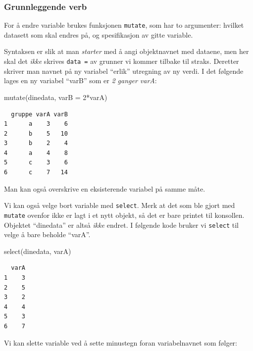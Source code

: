 \documentclass[
  letterpaper,
  DIV=11,
  numbers=noendperiod]{scrreprt}
\newenvironment{Shaded}{\begin{snugshade}}{\end{snugshade}}
\newcommand{\AttributeTok}[1]{\textcolor[rgb]{0.40,0.45,0.13}{#1}}
\newcommand{\DecValTok}[1]{\textcolor[rgb]{0.68,0.00,0.00}{#1}}
\newcommand{\FunctionTok}[1]{\textcolor[rgb]{0.28,0.35,0.67}{#1}}
\newcommand{\NormalTok}[1]{\textcolor[rgb]{0.00,0.23,0.31}{#1}}
\newcommand{\SpecialCharTok}[1]{\textcolor[rgb]{0.37,0.37,0.37}{#1}}
\theoremstyle{definition}
\theoremstyle{remark}
\begin{document}
\hypertarget{grunnleggende-verb}{%
\subsubsection{Grunnleggende verb}\label{grunnleggende-verb}}

For å endre variable brukes funksjonen \texttt{mutate}, som har to
argumenter: hvilket datasett som skal endres på, og spesifikasjon av
gitte variable.

Syntaksen er slik at man \emph{starter} med å angi objektnavnet med
dataene, men her skal det \emph{ikke} skrives \texttt{data\ =} av
grunner vi kommer tilbake til straks. Deretter skriver man navnet på ny
variabel ``erlik'' utregning av ny verdi. I det følgende lages en ny
variabel ``varB'' som er \emph{2 ganger varA}:

\begin{Shaded}
\begin{Highlighting}[]
\FunctionTok{mutate}\NormalTok{(dinedata, }\AttributeTok{varB =} \DecValTok{2}\SpecialCharTok{*}\NormalTok{varA)}
\end{Highlighting}
\end{Shaded}

\begin{verbatim}
  gruppe varA varB
1      a    3    6
2      b    5   10
3      b    2    4
4      a    4    8
5      c    3    6
6      c    7   14
\end{verbatim}

Man kan også overskrive en eksisterende variabel på samme måte.

Vi kan også velge bort variable med \texttt{select}. Merk at det som ble
gjort med \texttt{mutate} ovenfor ikke er lagt i et nytt objekt, så det
er bare printet til konsollen. Objektet ``dinedata'' er altså
\emph{ikke} endret. I følgende kode bruker vi \texttt{select} til velge
å bare beholde ``varA''.

\begin{Shaded}
\begin{Highlighting}[]
\FunctionTok{select}\NormalTok{(dinedata, varA)}
\end{Highlighting}
\end{Shaded}

\begin{verbatim}
  varA
1    3
2    5
3    2
4    4
5    3
6    7
\end{verbatim}

Vi kan slette variable ved å sette minustegn foran variabelnavnet som
følger:
\end{document}
